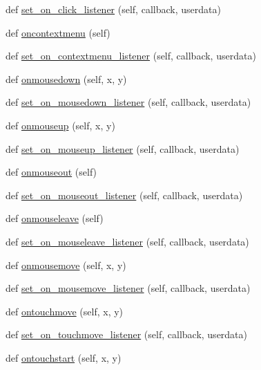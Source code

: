 \begin{DoxyCompactItemize}
def \hyperlink{classremi_1_1gui_1_1Widget_a960d4c24b9ca170541cd19203529c93b}{set\+\_\+on\+\_\+click\+\_\+listener} (self, callback, userdata)
\item 
def \hyperlink{classremi_1_1gui_1_1Widget_a9c709e4c55e735f56725657d34c411ce}{oncontextmenu} (self)
\item 
def \hyperlink{classremi_1_1gui_1_1Widget_a5cfa1789ddf5236fdd2c7e647da4ba2c}{set\+\_\+on\+\_\+contextmenu\+\_\+listener} (self, callback, userdata)
\item 
def \hyperlink{classremi_1_1gui_1_1Widget_a6fb4528091d3ecc9c92afe12aabd3735}{onmousedown} (self, x, y)
\item 
def \hyperlink{classremi_1_1gui_1_1Widget_a7e570c33dfb5cd49ec50bcbe5831ecb4}{set\+\_\+on\+\_\+mousedown\+\_\+listener} (self, callback, userdata)
\item 
def \hyperlink{classremi_1_1gui_1_1Widget_ad8bff8cf2b3e2cea4682f7879b3b6e99}{onmouseup} (self, x, y)
\item 
def \hyperlink{classremi_1_1gui_1_1Widget_a8b4dafe3427623f86c5daf620c4ceeb1}{set\+\_\+on\+\_\+mouseup\+\_\+listener} (self, callback, userdata)
\item 
def \hyperlink{classremi_1_1gui_1_1Widget_a1462eb1d4a9d2abd8300c3088b56b960}{onmouseout} (self)
\item 
def \hyperlink{classremi_1_1gui_1_1Widget_a661ee40bdce000e3b3c10e0ff053e9f9}{set\+\_\+on\+\_\+mouseout\+\_\+listener} (self, callback, userdata)
\item 
def \hyperlink{classremi_1_1gui_1_1Widget_aab5846ad3dc8451253f16fbd25b7440f}{onmouseleave} (self)
\item 
def \hyperlink{classremi_1_1gui_1_1Widget_ae8c8e5ba5c0d86e33260e1cebc070434}{set\+\_\+on\+\_\+mouseleave\+\_\+listener} (self, callback, userdata)
\item 
def \hyperlink{classremi_1_1gui_1_1Widget_adf1c0cfa83a0e76f4f05486dfb0873d6}{onmousemove} (self, x, y)
\item 
def \hyperlink{classremi_1_1gui_1_1Widget_a445eb69586824ebabf69ea49038310a1}{set\+\_\+on\+\_\+mousemove\+\_\+listener} (self, callback, userdata)
\item 
def \hyperlink{classremi_1_1gui_1_1Widget_a2758c6c73107f17c1f6da4a6a57208ec}{ontouchmove} (self, x, y)
\item 
def \hyperlink{classremi_1_1gui_1_1Widget_a026447b876f796e01e9fac38626826f9}{set\+\_\+on\+\_\+touchmove\+\_\+listener} (self, callback, userdata)
\item 
def \hyperlink{classremi_1_1gui_1_1Widget_a08f0da0147eee7053773f379562c879b}{ontouchstart} (self, x, y)

\end{DoxyCompactItemize}
